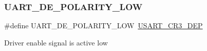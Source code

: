 \subsubsection{\texorpdfstring{UART\_DE\_POLARITY\_LOW}{UART\_DE\_POLARITY\_LOW}}
{\footnotesize\ttfamily \#define U\+A\+R\+T\+\_\+\+D\+E\+\_\+\+P\+O\+L\+A\+R\+I\+T\+Y\+\_\+\+L\+OW~\mbox{\hyperlink{group___peripheral___registers___bits___definition_ga2000c42015289291da1c58fe27800d64}{U\+S\+A\+R\+T\+\_\+\+C\+R3\+\_\+\+D\+EP}}}

Driver enable signal is active low 